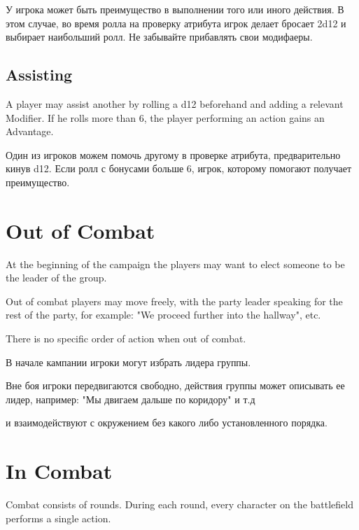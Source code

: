 \documentclass[a5paper,11pt]{book}
\begin{document}
\begin{multicols}{2}
\begin{ru}
У игрока может быть преимущество в выполнении того или иного действия. В этом случае, во время ролла на проверку атрибута игрок делает бросает 2d12 и выбирает наибольший ролл. Не забывайте прибавлять свои модифаеры.
\end{ru}

\subsection{Assisting}
\begin{en}
A player may assist another by rolling a d12 beforehand and adding a relevant Modifier. If he rolls more than 6, the player performing an action gains an Advantage.
\end{en}

\begin{ru}
Один из игроков можем помочь другому в проверке атрибута, предварительно кинув d12. Если ролл с бонусами больше 6, игрок, которому помогают получает преимущество.
\end{ru}

\section{Out of Combat}
\begin{en}
At the beginning of the campaign the players may want to elect someone to be the leader of the group.

Out of combat players may move freely, with the party leader speaking for the rest of the party, for example: "We proceed further into the hallway", etc.

There is no specific order of action when out of combat.
\end{en}

\begin{ru}
В начале кампании игроки могут избрать лидера группы.

Вне боя игроки передвигаются свободно, действия группы может описывать ее лидер, например: "Мы двигаем дальше по коридору" и т.д

и взаимодействуют с окружением без какого либо установленного порядка.
\end{ru}

\section{In Combat}
\begin{en}
Combat consists of rounds. During each round, every character on the battlefield performs a single action.
\end{en}


\end{multicols}
\end{document}
